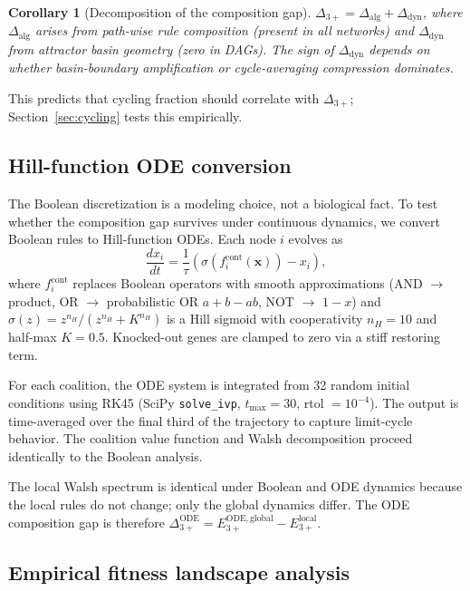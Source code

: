 \documentclass[10pt]{article}
\newtheorem{corollary}[proposition]{Corollary}
\begin{document}
\begin{corollary}[Decomposition of the composition gap]
\label{cor:decomposition}
$\Delta_{3+} = \Delta_{\mathrm{alg}} + \Delta_{\mathrm{dyn}}$,
where $\Delta_{\mathrm{alg}}$ arises from path-wise rule composition
(present in all networks) and $\Delta_{\mathrm{dyn}}$ from attractor
basin geometry (zero in DAGs). The sign of
$\Delta_{\mathrm{dyn}}$ depends on whether basin-boundary
amplification or cycle-averaging compression dominates.
\end{corollary}

This predicts that cycling fraction should correlate with
$\Delta_{3+}$; Section~\ref{sec:cycling} tests this empirically.


\subsection{Hill-function ODE conversion}
\label{sec:ode-method}

The Boolean discretization is a modeling choice, not a biological
fact. To test whether the composition gap survives under continuous
dynamics, we convert Boolean rules to Hill-function ODEs. Each node
$i$ evolves as
\begin{equation}
  \frac{dx_i}{dt} = \frac{1}{\tau}
  \left( \sigma\!\left(f_i^{\mathrm{cont}}(\mathbf{x})\right) - x_i \right),
\end{equation}
where $f_i^{\mathrm{cont}}$ replaces Boolean operators with smooth
approximations (AND $\to$ product, OR $\to$ probabilistic OR
$a + b - ab$, NOT $\to$ $1 - x$) and $\sigma(z) = z^{n_H} / (z^{n_H} + K^{n_H})$
is a Hill sigmoid with cooperativity $n_H = 10$ and half-max $K = 0.5$.
Knocked-out genes are clamped to zero via a stiff restoring term.

For each coalition, the ODE system is integrated from 32 random
initial conditions using RK45 (SciPy \texttt{solve\_ivp},
$t_{\max} = 30$, rtol $= 10^{-4}$). The output is time-averaged
over the final third of the trajectory to capture limit-cycle
behavior. The coalition value function and Walsh decomposition
proceed identically to the Boolean analysis.

The local Walsh spectrum is identical under Boolean and ODE dynamics
because the local rules do not change; only the global dynamics
differ. The ODE composition gap is therefore
$\Delta_{3+}^{\mathrm{ODE}} = E_{3+}^{\mathrm{ODE,global}} - E_{3+}^{\mathrm{local}}$.


\subsection{Empirical fitness landscape analysis}
\label{sec:empirical-method}
\end{document}
